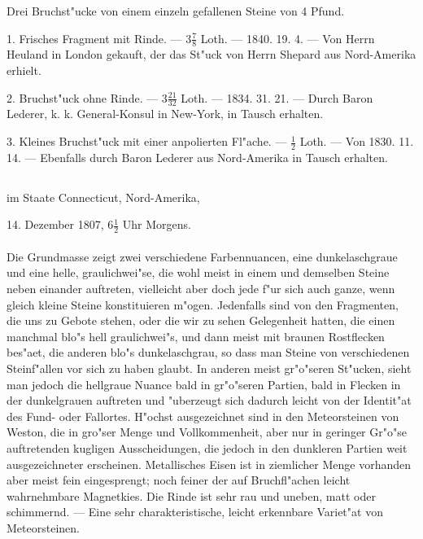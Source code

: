 \documentclass[a4paper, 11pt, oneside, polutonikogreek, german]{article}
\begin{document}
Drei Bruchst"ucke von einem einzeln gefallenen Steine von 4 Pfund.

1. Frisches Fragment mit Rinde. --- $3\frac{7}{8}$ Loth. --- 1840. 19. 4. --- Von Herrn Heuland in London gekauft, der das St"uck von Herrn Shepard aus Nord-Amerika erhielt.

2. Bruchst"uck ohne Rinde. --- $3\frac{21}{32}$ Loth. --- 1834. 31. 21. --- Durch Baron Lederer, k. k. General-Konsul in New-York, in Tausch erhalten.

3. Kleines Bruchst"uck mit einer anpolierten Fl"ache. --- $\frac{1}{2}$ Loth. --- Von 1830. 11. 14. --- Ebenfalls durch Baron Lederer aus Nord-Amerika in Tausch erhalten.
\subsection[\frakfamily{Weston.}]{}
\begin{center}

im Staate Connecticut, Nord-Amerika,

14. Dezember 1807, $6\frac{1}{2}$ Uhr Morgens.
\end{center}
\paragraph{}
Die Grundmasse zeigt zwei verschiedene Farbennuancen, eine dunkelaschgraue und eine helle, graulichwei"se, die wohl meist in einem und demselben Steine neben einander auftreten, vielleicht aber doch jede f"ur sich auch ganze, wenn gleich kleine Steine konstituieren m"ogen. Jedenfalls sind von den Fragmenten, die uns zu Gebote stehen, oder die wir zu sehen Gelegenheit hatten, die einen manchmal blo"s hell graulichwei"s, und dann meist mit braunen Rostflecken bes"aet, die anderen blo"s dunkelaschgrau, so dass man Steine von verschiedenen Steinf"allen vor sich zu haben glaubt. In anderen meist gr"o"seren St"ucken, sieht man jedoch die hellgraue Nuance bald in gr"o"seren Partien, bald in Flecken in der dunkelgrauen auftreten und "uberzeugt sich dadurch leicht von der Identit"at des Fund- oder Fallortes. H"ochst ausgezeichnet sind in den Meteorsteinen von Weston, die in gro"ser Menge und Vollkommenheit, aber nur in geringer Gr"o"se auftretenden kugligen Ausscheidungen, die jedoch in den dunkleren Partien weit ausgezeichneter erscheinen. Metallisches Eisen ist in ziemlicher Menge vorhanden aber meist fein eingesprengt; noch feiner der auf Bruchfl"achen leicht wahrnehmbare Magnetkies. Die Rinde ist sehr rau und uneben, matt oder schimmernd. --- Eine sehr charakteristische, leicht erkennbare Variet"at von Meteorsteinen.
\end{document}
